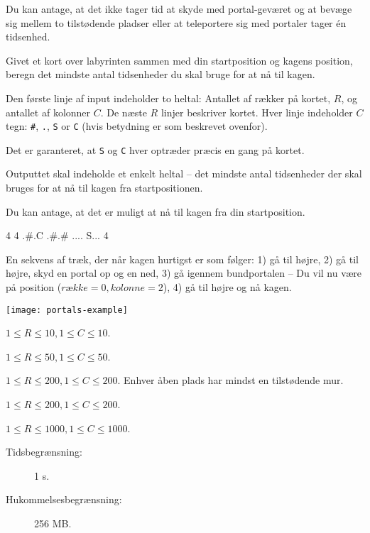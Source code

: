 \documentclass{boi2014-dk}
\newcommand{\constant}[1]{{\tt #1}}
\begin{document}
    Du kan antage, at det ikke tager tid at skyde med portal-geværet og at
    bevæge sig mellem to tilstødende pladser eller at teleportere sig med
    portaler tager én tidsenhed.

    \Task
    Givet et kort over labyrinten sammen med din startposition og kagens
    position, beregn det mindste antal tidsenheder du skal bruge for at nå til
    kagen.

    \Input
    Den første linje af input indeholder to heltal: Antallet af rækker på
    kortet, $R$, og antallet af kolonner $C$. De næste $R$ linjer beskriver
    kortet. Hver linje indeholder $C$ tegn: \constant{\#},
    \constant{.}, \constant{S} or \constant{C} (hvis betydning er som beskrevet
    ovenfor).

    Det er garanteret, at \constant{S} og \constant{C} hver optræder præcis en
    gang på kortet.

    \Output
    Outputtet skal indeholde et enkelt heltal -- det mindste antal tidsenheder
    der skal bruges for at nå til kagen fra startpositionen.

    Du kan antage, at det er muligt at nå til kagen fra din startposition.

    \Example
    \example
    {
        4 4\newline
        .\#.C\newline
        .\#.\#\newline
        ....\newline
        S...
    }
    {
        4
    }
    {
        En sekvens af træk, der når kagen hurtigst er som følger: 1) gå til
        højre, 2) gå til højre, skyd en portal op og en ned, 3) gå igennem
        bundportalen -- Du vil nu være på position ($række = 0, kolonne = 2$),
        4) gå til højre og nå kagen.

        \begin{center}
            \texttt{[image: portals-example]}
        \end{center}
    }

    \Scoring

    \begin{description}[leftmargin=0pt]
        \item[Delopgave 1 (? point):] $1 \le R \le 10, 1 \le C \le 10$.
        \item[Delopgave 2 (? point):] $1 \le R \le 50, 1 \le C \le 50$.
        \item[Delopgave 3 (? point):] $1 \le R \le 200, 1 \le C \le 200$.
            Enhver åben plads har mindst en tilstødende mur.
        \item[Delopgave 4 (? point):] $1 \le R \le 200, 1 \le C \le 200$.
        \item[Delopgave 5 (? point):] $1 \le R \le 1000, 1 \le C \le 1000$.
    \end{description}

    \Constraints

    \begin{description}
        \item[Tidsbegrænsning:] 1 s.
        \item[Hukommelsesbegrænsning:] 256 MB.
    \end{description}
\end{document}
